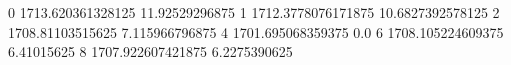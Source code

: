 0 1713.620361328125 11.92529296875
1 1712.3778076171875 10.6827392578125
2 1708.81103515625 7.115966796875
4 1701.695068359375 0.0
6 1708.105224609375 6.41015625
8 1707.922607421875 6.2275390625
